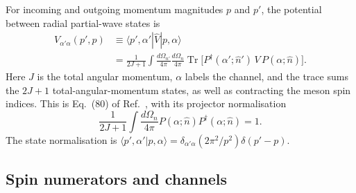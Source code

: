 For incoming and outgoing momentum magnitudes $p$ and $p'$, the potential
between radial partial-wave states is
\begin{equation}
\begin{split}
 V_{\alpha'\alpha}(p',p)
 &\equiv\langle p',\alpha'|\hat V|p,\alpha\rangle\\
 &=\frac{1}{2J+1}\int\frac{d\Omega_{n'}}{4\pi}\frac{d\Omega_n}{4\pi}
 \operatorname{Tr}\bigl[P^\dagger(\alpha';\hat n')\,V\,P(\alpha;\hat n)\bigr].
\end{split}
\label{eq:pw-projection}
\end{equation}
Here $J$ is the total angular momentum, $\alpha$ labels the channel, and the
trace sums the $2J+1$ total-angular-momentum states, as well as contracting
the meson spin indices. This is Eq.~(80) of Ref.~\cite{Zhang:2026iyr}, with
its projector normalisation
\begin{equation}
 \frac{1}{2J+1}\int\frac{d\Omega_n}{4\pi}
 P(\alpha;\hat n)P^\dagger(\alpha;\hat n)=1.
\end{equation}
The state normalisation is
$\langle p',\alpha'|p,\alpha\rangle
=\delta_{\alpha'\alpha}(2\pi^2/p^2)\delta(p'-p)$.

\subsection{Spin numerators and channels}

